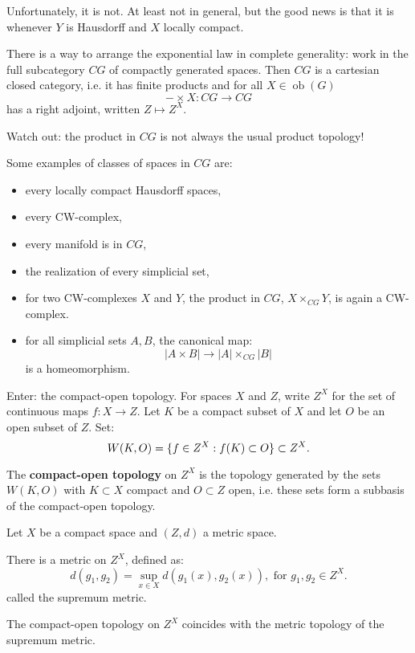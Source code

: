 Unfortunately, it is not. At least not in general, but the good news is that it is whenever $Y$ is Hausdorff and $X$ locally compact.

\begin{remark}
There is a way to arrange the exponential law in complete generality: work in the full subcategory $CG$ of compactly generated spaces. Then $CG$ is a cartesian closed category, i.e. it has finite products and for all $X\in\operatorname{ob}(G)$
\[-\times X:CG\to CG\]
has a right adjoint, written $Z\mapsto Z^X$.

Watch out: the product in $CG$ is not always the usual product topology!

Some examples of classes of spaces in $CG$ are:
\begin{itemize}[label={-}]
    \item every locally compact Hausdorff spaces,
    \item every CW-complex,
    \item every manifold is in $CG$,
    \item the realization of every simplicial set,
    \item for two CW-complexes $X$ and $Y$, the product in $CG$, $X\times_{CG}Y$, is again a CW-complex.
    \item for all simplicial sets $A,B$, the canonical map:
    \[|A\times B|\to|A|\times_{CG}|B|\]
    is a homeomorphism.
\end{itemize}
\end{remark}

Enter: the compact-open topology. For spaces $X$ and $Z$, write $Z^X$ for the set of continuous maps $f:X\to Z$. Let $K$ be a compact subset of $X$ and let $O$ be an open subset of $Z$. Set:
\[W(K,O)=\{f\in Z^X:f(K)\subset O\}\subset Z^X.\]

The \textbf{compact-open topology} on $Z^X$ is the topology generated by the sets $W(K,O)$ with $K\subset X$ compact and $O\subset Z$ open, i.e. these sets form a subbasis of the compact-open topology.

\begin{theorem}
Let $X$ be a compact space and $(Z,d)$ a metric space.
\begin{numerate}
\item There is a metric on $Z^X$, defined as:
\[d(g_1,g_2)=\sup_{x\in X}d(g_1(x),g_2(x)),\text{ for }g_1,g_2\in Z^X.\]
called the supremum metric.
\item The compact-open topology on $Z^X$ coincides with the metric topology of the supremum metric.
\end{numerate}
\end{theorem}

